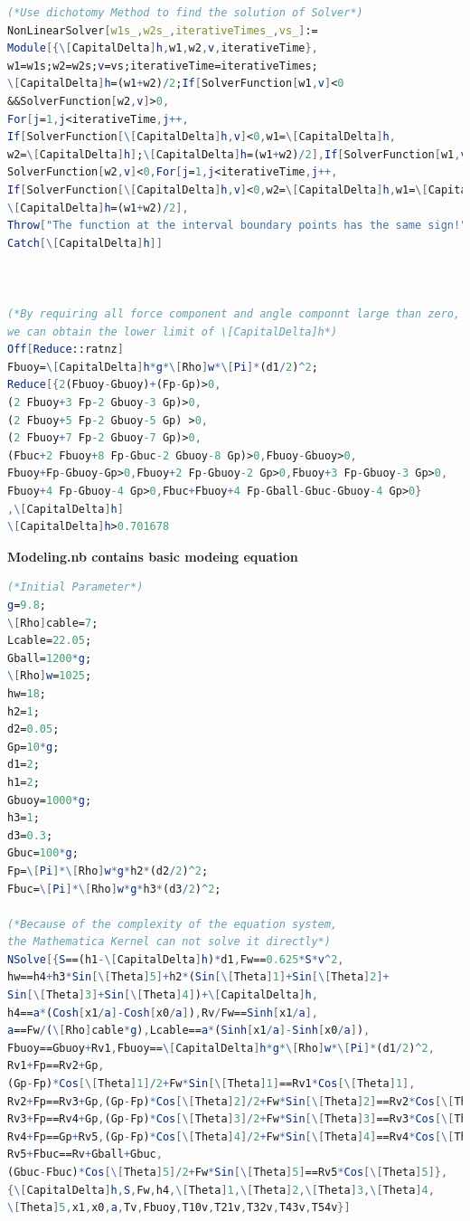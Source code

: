 \documentclass[a4paper,12pt]{ctexart}
\begin{document}
\begin{footnotesize}
\begin{lstlisting}[language=Mathematica]
(*Use dichotomy Method to find the solution of Solver*)
NonLinearSolver[w1s_,w2s_,iterativeTimes_,vs_]:=
Module[{\[CapitalDelta]h,w1,w2,v,iterativeTime},
w1=w1s;w2=w2s;v=vs;iterativeTime=iterativeTimes;
\[CapitalDelta]h=(w1+w2)/2;If[SolverFunction[w1,v]<0
&&SolverFunction[w2,v]>0,
For[j=1,j<iterativeTime,j++,
If[SolverFunction[\[CapitalDelta]h,v]<0,w1=\[CapitalDelta]h,
w2=\[CapitalDelta]h];\[CapitalDelta]h=(w1+w2)/2],If[SolverFunction[w1,v]>0&&
SolverFunction[w2,v]<0,For[j=1,j<iterativeTime,j++,
If[SolverFunction[\[CapitalDelta]h,v]<0,w2=\[CapitalDelta]h,w1=\[CapitalDelta]h];
\[CapitalDelta]h=(w1+w2)/2],
Throw["The function at the interval boundary points has the same sign!"]]];
Catch[\[CapitalDelta]h]]



(*By requiring all force component and angle componnt large than zero,
we can obtain the lower limit of \[CapitalDelta]h*)
Off[Reduce::ratnz]
Fbuoy=\[CapitalDelta]h*g*\[Rho]w*\[Pi]*(d1/2)^2;
Reduce[{2(Fbuoy-Gbuoy)+(Fp-Gp)>0,
(2 Fbuoy+3 Fp-2 Gbuoy-3 Gp)>0,
(2 Fbuoy+5 Fp-2 Gbuoy-5 Gp) >0,
(2 Fbuoy+7 Fp-2 Gbuoy-7 Gp)>0,
(Fbuc+2 Fbuoy+8 Fp-Gbuc-2 Gbuoy-8 Gp)>0,Fbuoy-Gbuoy>0,
Fbuoy+Fp-Gbuoy-Gp>0,Fbuoy+2 Fp-Gbuoy-2 Gp>0,Fbuoy+3 Fp-Gbuoy-3 Gp>0,
Fbuoy+4 Fp-Gbuoy-4 Gp>0,Fbuc+Fbuoy+4 Fp-Gball-Gbuc-Gbuoy-4 Gp>0}
,\[CapitalDelta]h]
\[CapitalDelta]h>0.701678
\end{lstlisting}

\textbf{Modeling.nb contains basic modeing equation}
\begin{lstlisting}[language=Mathematica]
(*Initial Parameter*)
g=9.8;
\[Rho]cable=7;
Lcable=22.05;
Gball=1200*g;
\[Rho]w=1025;
hw=18;
h2=1;
d2=0.05;
Gp=10*g;
d1=2;
h1=2;
Gbuoy=1000*g;
h3=1;
d3=0.3;
Gbuc=100*g;
Fp=\[Pi]*\[Rho]w*g*h2*(d2/2)^2;
Fbuc=\[Pi]*\[Rho]w*g*h3*(d3/2)^2;

(*Because of the complexity of the equation system, 
the Mathematica Kernel can not solve it directly*)
NSolve[{S==(h1-\[CapitalDelta]h)*d1,Fw==0.625*S*v^2,
hw==h4+h3*Sin[\[Theta]5]+h2*(Sin[\[Theta]1]+Sin[\[Theta]2]+
Sin[\[Theta]3]+Sin[\[Theta]4])+\[CapitalDelta]h,
h4==a*(Cosh[x1/a]-Cosh[x0/a]),Rv/Fw==Sinh[x1/a],
a==Fw/(\[Rho]cable*g),Lcable==a*(Sinh[x1/a]-Sinh[x0/a]),
Fbuoy==Gbuoy+Rv1,Fbuoy==\[CapitalDelta]h*g*\[Rho]w*\[Pi]*(d1/2)^2,
Rv1+Fp==Rv2+Gp,
(Gp-Fp)*Cos[\[Theta]1]/2+Fw*Sin[\[Theta]1]==Rv1*Cos[\[Theta]1],
Rv2+Fp==Rv3+Gp,(Gp-Fp)*Cos[\[Theta]2]/2+Fw*Sin[\[Theta]2]==Rv2*Cos[\[Theta]2],
Rv3+Fp==Rv4+Gp,(Gp-Fp)*Cos[\[Theta]3]/2+Fw*Sin[\[Theta]3]==Rv3*Cos[\[Theta]3],
Rv4+Fp==Gp+Rv5,(Gp-Fp)*Cos[\[Theta]4]/2+Fw*Sin[\[Theta]4]==Rv4*Cos[\[Theta]4],
Rv5+Fbuc==Rv+Gball+Gbuc,
(Gbuc-Fbuc)*Cos[\[Theta]5]/2+Fw*Sin[\[Theta]5]==Rv5*Cos[\[Theta]5]},
{\[CapitalDelta]h,S,Fw,h4,\[Theta]1,\[Theta]2,\[Theta]3,\[Theta]4,
\[Theta]5,x1,x0,a,Tv,Fbuoy,T10v,T21v,T32v,T43v,T54v}]


\end{lstlisting}
\end{footnotesize}
\end{document}
